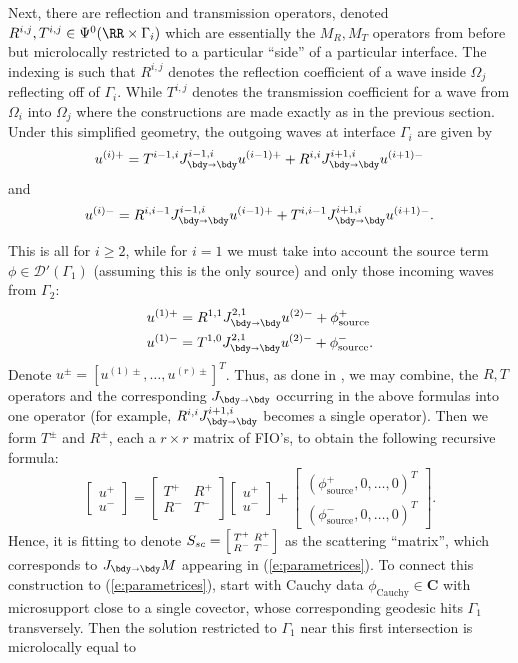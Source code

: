 \documentclass[10pt]{article}
\theoremstyle{plain}
\theoremstyle{definition}
\theoremstyle{remark}
\numberwithin{theorem}{section}
\numberwithin{example}{section}
\numberwithin{equation}{section}
\numberwithin{figure}{section}
\newcommand\JBB{J_{\bdy\shortrightarrow \bdy}}			%
\newcommand{\bmat}{\left[\begin{matrix}}
\newcommand{\emat}{\end{matrix}\right]}
\newcommand{\col}[1]{\begin{bmatrix}#1\end{bmatrix}}
\def \u{ \mathbf{u}} \def \f{\mathbf{f}}
\def \R{\mathcal{R}}
\begin{document}
Next, there are reflection and transmission operators, denoted $R^{i,j},T^{i,j} \in \Psi^0(\RR \times \Gamma_i)$ which are essentially the $M_R, M_T$ operators from before but microlocally restricted to a particular ``side'' of a particular interface. The indexing is such that $R^{i,j}$ denotes the reflection coefficient of a wave inside $\Omega_j$ reflecting off of $\Gamma_i$. While $T^{i,j}$ denotes the transmission coefficient for a wave from $\Omega_i$ into $\Omega_j$ where the constructions are made exactly as in the previous section.
Under this simplified geometry, the outgoing waves at interface $\Gamma_i$ are given by 
\[
u^{(i)+} = T^{i-1,i}\JBB^{i-1,i}u^{(i-1)+} +R^{i,i}\JBB^{i+1,i}u^{(i+1)-}
\]
and
\[
u^{(i)-} = R^{i,i-1}\JBB^{i-1,i}u^{(i-1)+} +T^{i,i-1}\JBB^{i+1,i}u^{(i+1)-}.
\]

This is all for $i\geq 2$, while for $i=1$ we must take into account the source term $\phi \in \mathcal{D}'(\Gamma_1)$ (assuming this is the only source) and only those incoming waves from $\Gamma_2$:
\begin{align*}
u^{(1)+} &= R^{1,1}\JBB^{2,1}u^{(2)-} + \phi_{\text{source}}^+ \\
u^{(1)-} &= T^{1,0}\JBB^{2,1}u^{(2)-} + \phi_{\text{source}}^-.
\end{align*}
Denote $u^{\pm} = [u^{(1)\pm}, \dots, u^{(r)\pm}]^T$. Thus, as done in \cite{Cist73}, we may combine, the $R,T$ operators and the corresponding $\JBB$ occurring in the above formulas into one operator (for example, $R^{i,i}\JBB^{i+1,i}$ becomes a single operator). Then we form $T^{\pm}$ and $R^{\pm}$, each a $r \times r$ matrix of FIO's, to obtain the following recursive formula:
\[
\col{ u^+ \\ u^-} = \bmat T^+ & R^+ \\R^- & T^- \emat \col{u^+\\u^-} + \col{(\phi^+_{\text{source}},0,\dots,0)^T\\(\phi^-_{\text{source}},0,\dots,0)^T}.
\]
Hence, it is fitting to denote $S_{sc} = \begin{bsmallmatrix} T^+ & R^+ \\R^- & T^- \end{bsmallmatrix}$ as the scattering ``matrix'', which corresponds to $\JBB M$ appearing in (\ref{e:parametrices}). To connect this construction to (\ref{e:parametrices}), start with Cauchy data $\phi_{\text{Cauchy}} \in \mathbf{C}$ with microsupport close to a single covector, whose corresponding geodesic hits $\Gamma_1$ transversely. Then the solution restricted to $\Gamma_1$ near this first intersection is microlocally equal to
\end{document}
